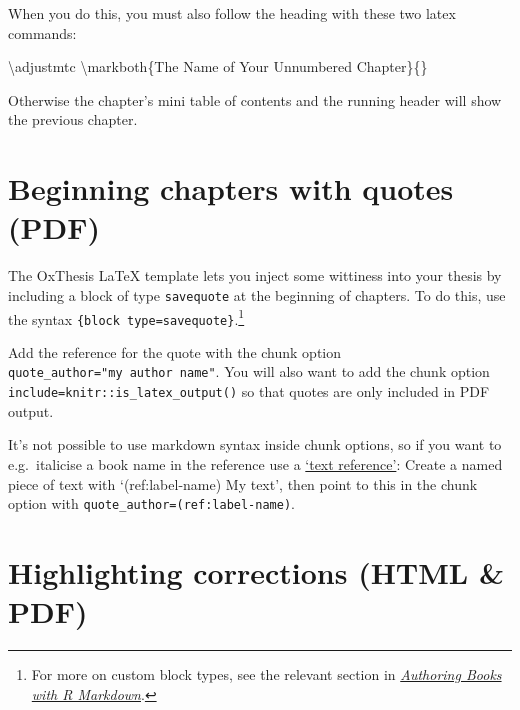 \documentclass[a4paper, twoside]{templates/ociamthesis}
\newenvironment{Shaded}{\begin{snugshade}}{\end{snugshade}}
\newcommand{\FunctionTok}[1]{\textcolor[rgb]{0.00,0.00,0.00}{#1}}
\newcommand{\NormalTok}[1]{#1}
\renewenvironment{Shaded}
{
  \vspace{10pt}%
  \begin{snugshade}%
}{%
  \end{snugshade}%
  \vspace{8pt}%
}
\theoremstyle{definition}
\theoremstyle{definition}
\theoremstyle{definition}
\theoremstyle{definition}
\theoremstyle{remark}
\begin{document}
When you do this, you must also follow the heading with these two latex commands:

\begin{Shaded}
\begin{Highlighting}[]
\FunctionTok{\textbackslash{}adjustmtc}
\FunctionTok{\textbackslash{}markboth}\NormalTok{\{The Name of Your Unnumbered Chapter\}\{\}}
\end{Highlighting}
\end{Shaded}

Otherwise the chapter's mini table of contents and the running header will show the previous chapter.

\hypertarget{beginning-chapters-with-quotes-pdf}{%
\section{Beginning chapters with quotes (PDF)}\label{beginning-chapters-with-quotes-pdf}}

The OxThesis LaTeX template lets you inject some wittiness into your thesis by including a block of type \texttt{savequote} at the beginning of chapters.
To do this, use the syntax \texttt{\textasciigrave{}\textasciigrave{}\textasciigrave{}\{block\ type=\textquotesingle{}savequote\textquotesingle{}\}}.\footnote{For more on custom block types, see the relevant section in \href{https://bookdown.org/yihui/bookdown/custom-blocks.html}{\emph{Authoring Books with R Markdown}}.}

Add the reference for the quote with the chunk option \texttt{quote\_author="my\ author\ name"}.
You will also want to add the chunk option \texttt{include=knitr::is\_latex\_output()} so that quotes are only included in PDF output.

It's not possible to use markdown syntax inside chunk options, so if you want to e.g.~italicise a book name in the reference use a \href{https://bookdown.org/yihui/bookdown/markdown-extensions-by-bookdown.html\#text-references}{`text reference'}: Create a named piece of text with `(ref:label-name) My text', then point to this in the chunk option with \texttt{quote\_author=\textquotesingle{}(ref:label-name)\textquotesingle{}}.

\hypertarget{highlighting-corrections-html-pdf}{%
\section{Highlighting corrections (HTML \& PDF)}\label{highlighting-corrections-html-pdf}}
\end{document}
